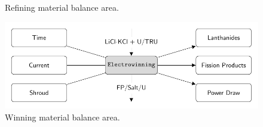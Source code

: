 \begin{frame}
\begin{columns}
\begin{column}{.5\textwidth}
\begin{figure}
			\caption{Refining material balance area.}
			\label{fig:refining}
		\end{figure}
		\begin{figure} 
			\centering
			\includegraphics[width=0.8\linewidth]{winning}
			\caption{Winning material balance area.}
			\label{fig:winning}
		\end{figure}
	\end{column}
\end{columns} 
\end{frame}